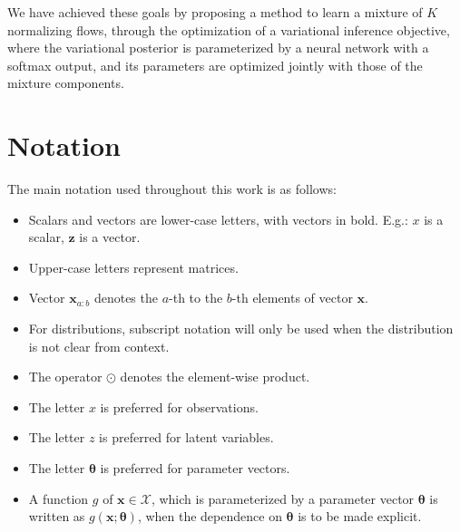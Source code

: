 We have achieved these goals by proposing a method to learn a mixture of
$K$ normalizing flows, through the optimization of a variational inference
objective, where the variational posterior is parameterized by a neural network
with a softmax output, and its parameters are optimized jointly with those of
the mixture components.

\section{Notation}
\label{section:notation}
The main notation used throughout this work is as follows:

\begin{itemize}
    \item Scalars and vectors are lower-case letters, with vectors in bold. E.g.:
    $x$ is a scalar, $\mathbf{z}$ is a vector.
    \item Upper-case letters represent matrices.
    \item Vector $\bm{x}_{a:b}$ denotes the $a$-th to the $b$-th elements
    of vector $\bm{x}$.
    \item For distributions, subscript notation will only be used when the
distribution is not clear from context.
    \item The operator $\odot$ denotes the element-wise product.
    \item The letter $x$ is preferred for observations.
    \item The letter $z$ is preferred for latent variables.
    \item The letter $\bm\theta$ is preferred for parameter vectors.
    \item A function $g$ of $\bm{x} \in \bm{\mathcal{X}}$, which is parameterized
    by a parameter vector $\bm\theta$ is written as $g(\bm{x};\bm\theta)$, when
    the dependence on $\bm\theta$ is to be made explicit.
\end{itemize}
